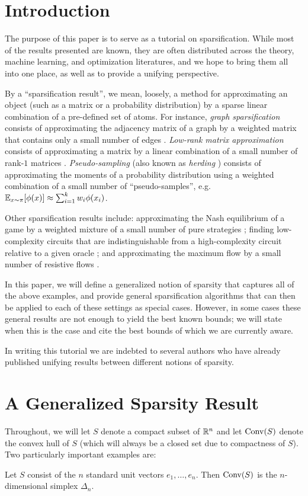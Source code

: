 \documentclass[paper.tex]{subfiles}
\begin{document}
\section{Introduction} 
\label{sec:intro}

The purpose of this paper is to serve as a tutorial on sparsification. While 
most of the results presented are known, they are often distributed across the 
theory, machine learning, and optimization literatures, and we hope to bring 
them all into one place, as well as to provide a unifying perspective. 

By a ``sparsification result'', we mean, loosely, a method for approximating an 
object (such as a matrix or a probability distribution) by a sparse linear 
combination of a pre-defined set of atoms. For instance, \emph{graph 
sparsification} consists of approximating the adjacency matrix of a graph by a 
weighted matrix that contains only a small number of edges \cite{?}. 
\emph{Low-rank matrix approximation} consists of approximating a matrix by a 
linear combination of a small number of rank-$1$ matrices \cite{?}. 
\emph{Pseudo-sampling} (also known as \emph{herding} \cite{?}) consists of 
approximating the moments of a probability distribution using a weighted 
combination of a small number of ``pseudo-samples'', e.g. 
$\mathbb{E}_{x \sim \pi}[\phi(x)] \approx \sum_{i=1}^k w_i \phi(x_i)$.

Other sparsification results include:  approximating the 
Nash equilibrium of a game by a weighted mixture of a small number of pure 
strategies \cite{?}; finding low-complexity circuits that are indistinguishable 
from a high-complexity circuit relative to a given oracle \cite{?}; and 
approximating the maximum flow by a small number of resistive flows \cite{?}.

In this paper, we will define a generalized notion of sparsity that captures 
all of the above examples, and provide general sparsification algorithms that 
can then be applied to each of these settings as special cases. However, in some 
cases these general results are not enough to yield the best known bounds; we will 
state when this is the case and cite the best bounds of which we are currently 
aware.

In writing this tutorial we are indebted to several authors who have already 
published unifying results between different notions of sparsity. 

\section{A Generalized Sparsity Result}
Throughout, we will let $S$ denote a 
compact subset of $\mathbb{R}^n$ and let $\operatorname{Conv}(S)$ denote the convex hull of $S$ 
(which will always be a closed set due to compactness of $S$). Two particularly 
important examples are:
\begin{example}
\label{ex:simplex}
Let $S$ consist of the $n$ standard unit vectors $e_1, \ldots, e_n$. Then 
$\operatorname{Conv}(S)$ is the $n$-dimensional simplex $\Delta_n$.
\end{example}
\end{document}
